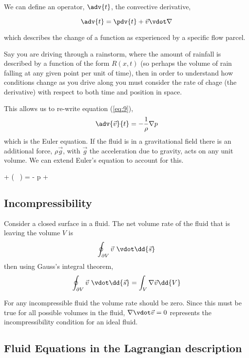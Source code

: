 We can define an operator, $\adv{t}$, the convective derivative,
\begin{definition}
  \[ \adv{t} = \pdv{t} + \vec{v} \vdot \nabla \]
\end{definition}
which describes the change of a function as experienced by a specific
flow parcel.
\begin{example}
  Say you are driving through a rainstorm, where the amount of
  rainfall is described by a function of the form $R(x,t)$ (so perhaps
  the volume of rain falling at any given point per unit of time),
  then in order to understand how conditions change as you drive along
  you must consider the rate of chage (the derivative) with respect to
  both time and position in space.
\end{example}
This allows us to re-write equation (\ref{eq:9}),
\begin{equation}
  \label{eq:11}
  \adv{\vec{v}}{t} = - \frac{1}{\rho} \nabla p
\end{equation}
which is the Euler equation. If the fluid is
in a gravitational field there is an additional force, $\rho \vec{g}$,
with $\vec{g}$ the acceleration due to gravity, acts on any unit
volume. We can extend Euler's equation to account for this.

\begin{fequation}
   + ( \ \vdot \nabla)  = -  \nabla p + 
\end{fequation}

\subsection{Incompressibility}
\label{sec:incompressibility}

Consider a closed surface in a fluid. The net volume rate of the fluid
that is leaving the volume $V$ is
\[ \oint_{\partial V} \vec{v} \ \vdot \dd{\vec{s}} \]
then using Gauss's integral theorem,
\[ \oint_{\partial V} \vec{v} \ \vdot \dd{\vec{s}} = \int_V \nabla
\vec{v} \dd{V} \]

For any incompressible fluid the volume rate should be zero. Since
this must be true for all possible volumes in the fluid, $\nabla \vdot
\vec{v} = 0$ represents the incompressibility condition for an ideal
fluid.

\subsection{Fluid Equations in the Lagrangian description}
\label{sec:fluid-equat-lagr}

